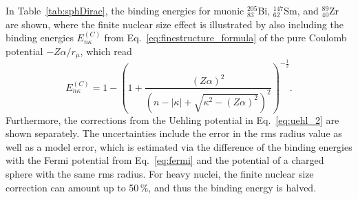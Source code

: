 In Table~\ref{tab:sphDirac}, the binding energies for muonic $^{205}_{83}$Bi, $^{147}_{62}$Sm, and $^{89}_{40}$Zr are shown, where the finite nuclear size effect is illustrated by also including the binding energies $E^{(C)}_{n\kappa}$ from Eq.~\eqref{eq:finestructure_formula} of the pure Coulomb potential $-Z\alpha / r_\mu$, which read~\cite{greiner2000}
\begin{equation}
\label{eq:finestructure_formula_2}
E^{(C)}_{n\kappa}=1-\left(1+\frac{(Z\alpha)^2}{\left( n-|\kappa|+\sqrt{\kappa^2-(Z\alpha)^2} \right)^2}\right)^{-\frac{1}{2}}.
\end{equation}
Furthermore, the corrections from the Uehling potential in Eq.~\eqref{eq:uehl_2} are shown separately.
The uncertainties include the error in the rms radius value as well as a model error, which is estimated via the difference of the binding energies with the Fermi potential from Eq.~\eqref{eq:fermi} and the potential of a charged sphere with the same rms radius. For heavy nuclei, the finite nuclear size correction can amount up to 50$\,\%$, and thus the binding energy is halved.

